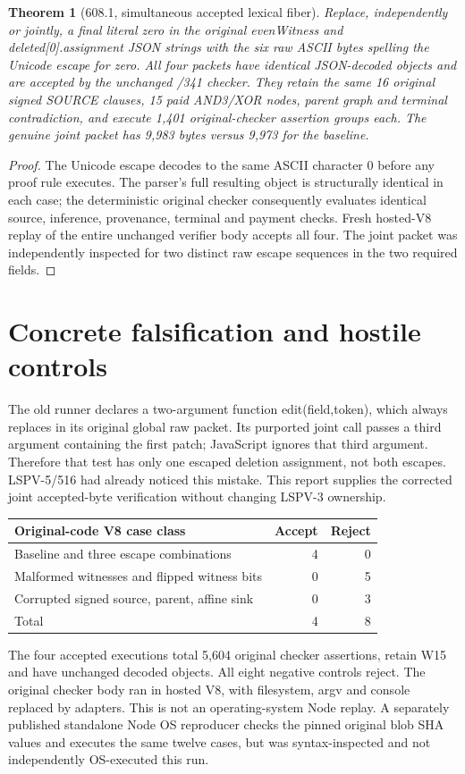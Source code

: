 \documentclass[11pt]{article}
\newtheorem{theorem}{Theorem}
\begin{document}
\begin{theorem}[608.1, simultaneous accepted lexical fiber]
Replace, independently or jointly, a final literal zero in the original evenWitness and deleted[0].assignment JSON strings with the six raw ASCII bytes spelling the Unicode escape for zero. All four packets have identical JSON-decoded objects and are accepted by the unchanged /341 checker. They retain the same 16 original signed SOURCE clauses, 15 paid AND3/XOR nodes, parent graph and terminal contradiction, and execute 1,401 original-checker assertion groups each. The genuine joint packet has 9,983 bytes versus 9,973 for the baseline.
\end{theorem}
\begin{proof}
The Unicode escape decodes to the same ASCII character 0 before any proof rule executes. The parser's full resulting object is structurally identical in each case; the deterministic original checker consequently evaluates identical source, inference, provenance, terminal and payment checks. Fresh hosted-V8 replay of the entire unchanged verifier body accepts all four. The joint packet was independently inspected for two distinct raw escape sequences in the two required fields. \end{proof}

\section*{Concrete falsification and hostile controls}
The old runner declares a two-argument function edit(field,token), which always replaces in its original global raw packet. Its purported joint call passes a third argument containing the first patch; JavaScript ignores that third argument. Therefore that test has only one escaped deletion assignment, not both escapes. LSPV-5/516 had already noticed this mistake. This report supplies the corrected joint accepted-byte verification without changing LSPV-3 ownership.

\begin{center}\begin{tabular}{lrr}\toprule
Original-code V8 case class & Accept & Reject\\\midrule
Baseline and three escape combinations & 4 & 0\\
Malformed witnesses and flipped witness bits & 0 & 5\\
Corrupted signed source, parent, affine sink & 0 & 3\\\midrule
Total & 4 & 8\\\bottomrule
\end{tabular}\end{center}
The four accepted executions total 5,604 original checker assertions, retain W15 and have unchanged decoded objects. All eight negative controls reject. The original checker body ran in hosted V8, with filesystem, argv and console replaced by adapters. This is not an operating-system Node replay. A separately published standalone Node OS reproducer checks the pinned original blob SHA values and executes the same twelve cases, but was syntax-inspected and not independently OS-executed this run.
\end{document}
